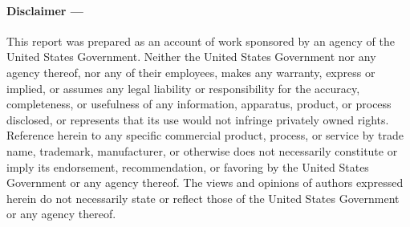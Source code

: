 \documentclass[8pt]{refart}
\begin{document}
\paragraph{Disclaimer ---} This report was prepared as an account of work sponsored by an agency of the United States Government. Neither the United States Government nor any agency thereof, nor any of their employees, makes any warranty, express or implied, or assumes any legal liability or responsibility for the accuracy, completeness, or usefulness of any information, apparatus, product, or process disclosed, or represents
that its use would not infringe privately owned rights. Reference herein to any specific commercial product, process, or service by trade name, trademark, manufacturer, or otherwise does not necessarily constitute or imply its endorsement, recommendation, or favoring by the United States Government or any agency thereof. The views and opinions of authors expressed herein do not necessarily state or reflect those of the United States Government or any agency thereof.
\end{document}
